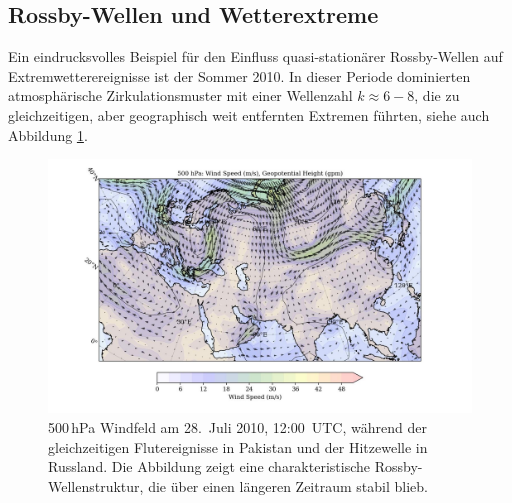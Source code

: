 \subsection{Rossby-Wellen und Wetterextreme}




Ein eindrucksvolles Beispiel für den Einfluss quasi-stationärer Rossby-Wellen
auf Extremwetterereignisse ist der Sommer 2010. In dieser Periode dominierten
atmosphärische Zirkulationsmuster mit einer Wellenzahl \(k \approx 6 - 8\), die zu
gleichzeitigen, aber geographisch weit entfernten Extremen führten, siehe auch Abbildung \ref{fig:rossby_2010}.


\begin{figure}
	\centering
	\includegraphics[width=\textwidth, trim=2cm 0cm 3cm 0cm, clip]{papers/rossby/images/data_2010_7_28_12_00_500.jpg}
	\caption{500\,hPa Windfeld am
		28.\ Juli 2010, 12:00~UTC, während der gleichzeitigen Flutereignisse in Pakistan und
		der Hitzewelle in Russland. Die Abbildung zeigt eine charakteristische Rossby-Wellenstruktur,
		die über einen längeren Zeitraum stabil blieb.}
	\label{fig:rossby_2010}
\end{figure}



